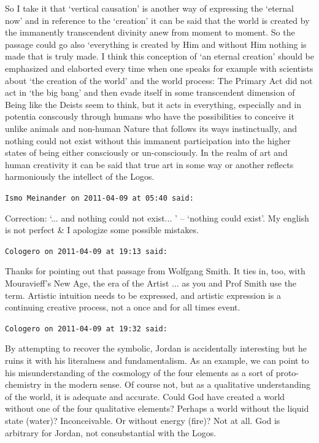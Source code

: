 \begin{footnotesize}
\begin{sffamily}
So I take it that `vertical causation' is another way of expressing the `eternal now' and in reference to the `creation' it can be said that the world is created by the immanently transcendent divinity anew from moment to moment. So the passage could go also `everything is created by Him and without Him nothing is made that is truly made. I think this conception of `an eternal creation' should be emphasized and elaborted every time when one speaks for example with scientists about `the creation of the world' and the world process: The Primary Act did not act in `the big bang' and then evade itself in some transcendent dimension of Being like the Deists seem to think, but it acts in everything, especially and in potentia conscously through humans who have the possibilities to conceive it unlike animals and non-human Nature that follows its ways instinctually, and nothing could not exist without this immanent participation into the higher states of being either consciously or un-consciously. In the realm of art and human creativity it can be said that true art in some way or another reflects harmoniously the intellect of the Logos.

\hfill

\texttt{Ismo Meinander on 2011-04-09 at 05:40 said:}

Correction: `... and nothing could not exist... ' -- `nothing could exist'. My english is not perfect \& I apologize some possible mistakes.

\hfill

\texttt{Cologero on 2011-04-09 at 19:13 said:}

Thanks for pointing out that passage from Wolfgang Smith. It ties in, too, with Mouravieff's New Age, the era of the Artist ... as you and Prof Smith use the term. Artistic intuition needs to be expressed, and artistic expression is a continuing creative process, not a once and for all times event.

\hfill

\texttt{Cologero on 2011-04-09 at 19:32 said:}

By attempting to recover the symbolic, Jordan is accidentally interesting but he ruins it with his literalness and fundamentalism. As an example, we can point to his misunderstanding of the cosmology of the four elements as a sort of proto-chemistry in the modern sense. Of course not, but as a qualitative understanding of the world, it is adequate and accurate. Could God have created a world without one of the four qualitative elements? Perhaps a world without the liquid state (water)? Inconceivable. Or without energy (fire)? Not at all. God is arbitrary for Jordan, not consubstantial with the Logos.


\end{sffamily}
\end{footnotesize}
